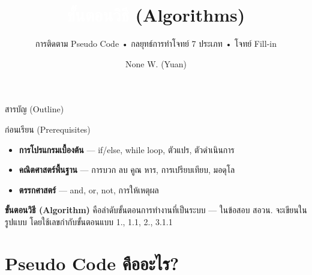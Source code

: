 \documentclass[11pt, aspectratio=169]{beamer}
\title[ขั้นตอนวิธี]{\textcolor{white}{ขั้นตอนวิธี} \textcolor{boxBlue!60}{(Algorithms)}}
\subtitle{การติดตาม Pseudo Code • กลยุทธ์การทำโจทย์ 7 ประเภท • โจทย์ Fill-in }
\author[None W. (Yuan)]{None W. (Yuan)}
\date{}
\begin{document}
\begin{frame}[plain]\titlepage\end{frame}
\begin{frame}{สารบัญ (Outline)}\tableofcontents\end{frame}

\begin{frame}{ก่อนเรียน (Prerequisites)}
  \begin{explanation}
    \begin{itemize}
      \item \textbf{การโปรแกรมเบื้องต้น} — if/else, while loop, ตัวแปร, ตัวดำเนินการ
      \item \textbf{คณิตศาสตร์พื้นฐาน} — การบวก ลบ คูณ หาร, การเปรียบเทียบ, มอดุโล
      \item \textbf{ตรรกศาสตร์} — and, or, not, การให้เหตุผล
    \end{itemize}
  \end{explanation}

  \begin{intuition}
    \textbf{ขั้นตอนวิธี (Algorithm)} คือลำดับขั้นตอนการทำงานที่เป็นระบบ
    — ในข้อสอบ สอวน. จะเขียนในรูปแบบ 
    โดยใช้เลขกำกับขั้นตอนแบบ 1., 1.1, 2., 3.1.1
  \end{intuition}
\end{frame}

\section{Pseudo Code คืออะไร?}
\end{document}
